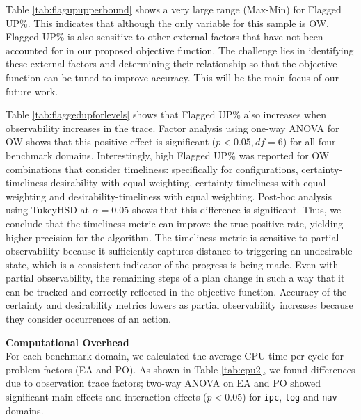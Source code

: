 Table \ref{tab:flagupupperbound} shows a very large range (Max-Min) for Flagged UP\%. This indicates that although the only variable for this sample is OW, Flagged UP\% is also sensitive to other external factors that have not been accounted for in our proposed objective function. The challenge lies in identifying these external factors and determining their relationship so that the objective function can be tuned to improve accuracy. This will be the main focus of our future work. 

Table \ref{tab:flaggedupforlevels} shows that Flagged UP\% also increases when observability increases in the trace. Factor analysis using one-way ANOVA for OW shows that this positive effect is significant ($p<0.05, df=6$) for all four benchmark domains. Interestingly, high Flagged UP\% was reported for OW combinations that consider timeliness: specifically for configurations, certainty-timeliness-desirability with equal weighting, certainty-timeliness with equal weighting and desirability-timeliness with equal weighting. Post-hoc analysis using TukeyHSD at $\alpha=0.05$ shows that this difference is significant. Thus, we conclude that the timeliness metric can improve the true-positive rate, yielding higher precision for the algorithm. The timeliness metric is sensitive to partial observability because it sufficiently captures distance to triggering an undesirable state, which is a consistent indicator of the progress is being made. Even with partial observability, the remaining steps of a plan change in such a way that it can be tracked and correctly reflected in the objective function. Accuracy of the certainty and desirability metrics lowers as partial observability increases because they consider occurrences of an action. 


\textbf{Computational Overhead}\\
For each benchmark domain, we calculated the average CPU time per cycle for problem factors (EA and PO). As shown in Table \ref{tab:cpu2}, we found differences due to observation trace factors; two-way ANOVA on EA and PO showed significant main effects and interaction effects ($p<$0.05) for \texttt{ipc}, \texttt{log} and \texttt{nav} domains.



